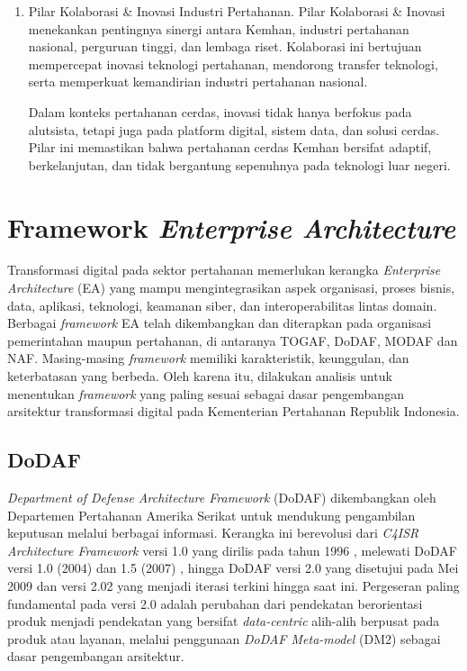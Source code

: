 \begin{enumerate}
  \item Pilar Kolaborasi \& Inovasi Industri Pertahanan.
  Pilar Kolaborasi \& Inovasi menekankan pentingnya sinergi antara Kemhan, industri pertahanan nasional, perguruan tinggi, dan lembaga riset.
  Kolaborasi ini bertujuan mempercepat inovasi teknologi pertahanan, mendorong transfer teknologi, serta memperkuat kemandirian industri pertahanan nasional.

  Dalam konteks pertahanan cerdas, inovasi tidak hanya berfokus pada alutsista, tetapi juga pada platform digital, sistem data, dan solusi cerdas.
  Pilar ini memastikan bahwa pertahanan cerdas Kemhan bersifat adaptif, berkelanjutan, dan tidak bergantung sepenuhnya pada teknologi luar negeri.
\end{enumerate}

\section{Framework \textit{Enterprise Architecture}}
Transformasi digital pada sektor pertahanan memerlukan kerangka \textit{Enterprise Architecture} (EA) yang mampu mengintegrasikan aspek organisasi, proses bisnis, data, aplikasi, teknologi, keamanan siber, dan interoperabilitas lintas domain.
Berbagai \textit{framework} EA telah dikembangkan dan diterapkan pada organisasi pemerintahan maupun pertahanan, di antaranya TOGAF, DoDAF, MODAF dan NAF.
Masing-masing \textit{framework} memiliki karakteristik, keunggulan, dan keterbatasan yang berbeda.
Oleh karena itu, dilakukan analisis untuk menentukan \textit{framework} yang paling sesuai sebagai dasar pengembangan arsitektur transformasi digital pada Kementerian Pertahanan Republik Indonesia.

\subsection{DoDAF}
\textit{Department of Defense Architecture Framework} (DoDAF) dikembangkan oleh Departemen Pertahanan Amerika Serikat untuk mendukung pengambilan keputusan melalui berbagai informasi.
Kerangka ini berevolusi dari \textit{C4ISR Architecture Framework} versi 1.0 yang dirilis pada tahun 1996 \autocite{C4ISRAWG1998}, melewati DoDAF versi 1.0 (2004) \autocite{DoDAF2007v15} dan 1.5 (2007) \autocite{DoDAF2007v15VolII}, hingga DoDAF versi 2.0 \autocite{DoDAF2010v20} yang disetujui pada Mei 2009 dan versi 2.02 \autocite{DoDAF2011v202} yang menjadi iterasi terkini hingga saat ini.
Pergeseran paling fundamental pada versi 2.0 adalah perubahan dari pendekatan berorientasi produk menjadi pendekatan yang bersifat \textit{data-centric} alih-alih berpusat pada produk atau layanan, melalui penggunaan \textit{DoDAF Meta-model} (DM2) sebagai dasar pengembangan arsitektur.

